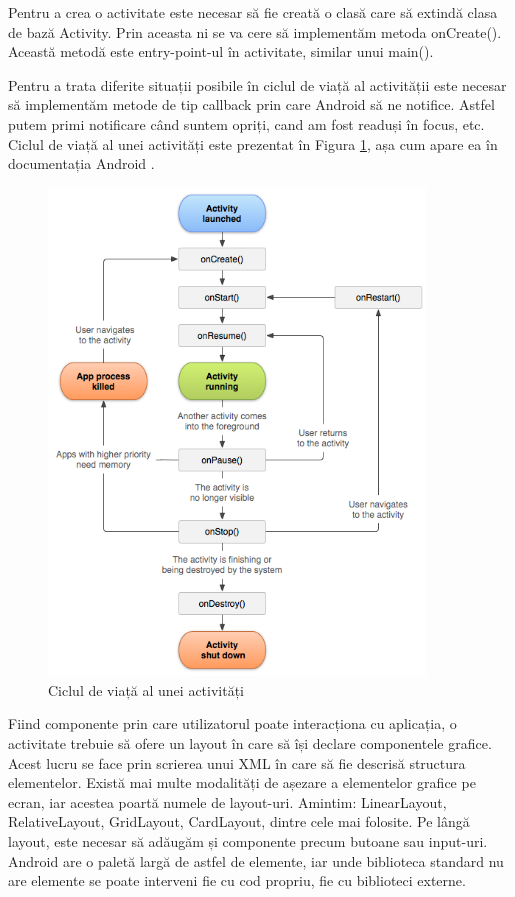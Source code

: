 \documentclass[12pt,a4paper]{article}
\begin{document}
Pentru a crea o activitate este necesar să fie creată o clasă care să extindă clasa de bază Activity. Prin aceasta ni se va cere să implementăm metoda onCreate(). Această metodă este entry-point-ul în activitate, similar unui main().

Pentru a trata diferite situații posibile în ciclul de viață al activității este necesar să implementăm metode de tip callback prin care Android să ne notifice. Astfel putem primi notificare când suntem opriți, cand am fost readuși în focus, etc. Ciclul de viață al unei activități este prezentat în Figura \ref{fig:activity_lifecycle}, așa cum apare ea în documentația Android \cite{DeveloperAndroid}.

\begin{figure}[h]
\centering
\includegraphics[width=10cm]{figures/activity_lifecycle.png}
\caption{Ciclul de viață al unei activități}
\label{fig:activity_lifecycle}
\end{figure}

Fiind componente prin care utilizatorul poate interacționa cu aplicația, o activitate trebuie să ofere un layout în care să își declare componentele grafice. Acest lucru se face prin scrierea unui XML în care să fie descrisă structura elementelor. Există mai multe modalități de așezare a elementelor grafice pe ecran, iar acestea poartă numele de layout-uri. Amintim: LinearLayout, RelativeLayout, GridLayout, CardLayout, dintre cele mai folosite. Pe lângă layout, este necesar să adăugăm și componente precum butoane sau input-uri. Android are o paletă largă de astfel de elemente, iar unde biblioteca standard nu are elemente se poate interveni fie cu cod propriu, fie cu biblioteci externe.
\end{document}
